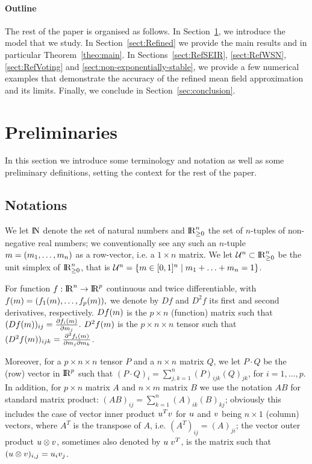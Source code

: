 \documentclass{elsarticle}
\begin{document}
\paragraph*{Outline} The rest of the paper is organised as follows. In
Section~\ref{sect:preliminaries}, we introduce the model that we
study. In Section~\ref{sect:Refined} we provide the main results and
in particular Theorem~\ref{theo:main}. In Sections~\ref{sect:RefSEIR},
\ref{sect:RefWSN}, \ref{sect:RefVoting} and
\ref{sect:non-exponentially-stable}, we provide a few numerical
examples that demonstrate the accuracy of the refined mean field
approximation and its limits. Finally, we conclude in
Section~\ref{sec:conclusion}.

\section{Preliminaries}
\label{sect:preliminaries}

In this section we introduce some terminology and notation as well as
some preliminary definitions, setting the context for the rest of the
paper.


\subsection{Notations}

We let $\mathrm{I\!N}$ denote the set of natural numbers and $\mathrm{I\!R}_{\geq 0}^n$ the
set of $n$-tuples of non-negative real numbers; we conventionally see
any such an $n$-tuple $m=(m_1,\ldots,m_n)$ as a row-vector,
i.e. a $1 \times n$ matrix. We let ${\cal U}^n \subset \mathrm{I\!R}_{\geq 0}^n$ be the
unit simplex of $\mathrm{I\!R}_{\geq 0}^n$, that is
${\cal U}^n=\{m \in [0,1]^n \;|\; m_1 + \ldots +m_n =1\}$.

For function $f :\mathrm{I\!R}^n \rightarrow \mathrm{I\!R}^p$ continuous and twice
differentiable, with
$ f(m) = (f_1(m), \ldots, f_p(m)), $ we denote by $Df$
and $D^2f$ its first and second derivatives, respectively. $D f (m)$ is the
$p \times n$ (function) matrix such that
$(D f (m))_{ij} = \frac{\partial f_i(m)}{\partial m_j}$.
$D^2 f (m)$ is the $p \times n \times n$ tensor such that
$(D^2 f (m))_{ijk} = \frac{\partial^2 f_i(m)}{\partial
  m_j\partial m_k}$.

Moreover, for a $p \times n \times n$ tensor $P$ and a $n \times n$
matrix $Q$, we let $P \cdot Q$ be the (row) vector in $\mathrm{I\!R}^p$ such
that $(P \cdot Q)_i = \sum_{j,k=1}^n (P)_{ijk}(Q)_{jk}$, for
$i=1,\ldots, p$.  In addition, for $p \times n$ matrix $A$ and
$n \times m$ matrix $B$ we use the notation $AB$ for standard matrix
product: $(AB)_{ij} = \sum_{k=1}^n (A)_{ik}(B)_{kj}$; obviously this
includes the case of vector inner product $u^T v$ for
$u$ and $v$ being $n \times 1$ (column) vectors, where $A^T$
is the transpose of $A$, i.e. $(A^T)_{ij}=(A)_{ji}$; the vector outer
product $u \otimes v$, sometimes also denoted by
$u \;v^T$, is the matrix such that
$(u \otimes v)_{i,j} = u_iv_j$.
\end{document}
